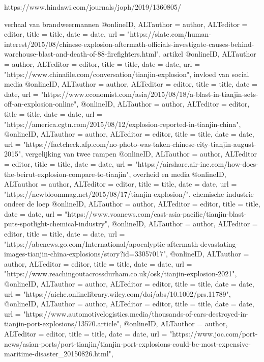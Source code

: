 {{{{{{{{{{{https://www.hindawi.com/journals/joph/2019/1360805/ 
\cite{jiang16042019TanjinExplosion}

verhaal van brandweermannen
@online{ID,	ALTauthor = {author},	ALTeditor = {editor},	title = {title},	date = {date},	url = {"https://slate.com/human-interest/2015/08/chinese-explosion-aftermath-officials-investigate-causes-behind-warehouse-blast-and-death-of-88-firefighters.html"},}
artikel
@online{ID,	ALTauthor = {author},	ALTeditor = {editor},	title = {title},	date = {date},	url = {"https://www.chinafile.com/conversation/tianjin-explosion"},}
invloed van social media
@online{ID,	ALTauthor = {author},	ALTeditor = {editor},	title = {title},	date = {date},	url = {"https://www.economist.com/asia/2015/08/18/a-blast-in-tianjin-sets-off-an-explosion-online"},}
@online{ID,	ALTauthor = {author},	ALTeditor = {editor},	title = {title},	date = {date},	url = {"https://america.cgtn.com/2015/08/12/explosion-reported-in-tianjin-china"},}
@online{ID,	ALTauthor = {author},	ALTeditor = {editor},	title = {title},	date = {date},	url = {"https://factcheck.afp.com/no-photo-was-taken-chinese-city-tianjin-august-2015"},}
vergelijking van twee rampen
@online{ID,	ALTauthor = {author},	ALTeditor = {editor},	title = {title},	date = {date},	url = {"https://airshare.air-inc.com/how-does-the-beirut-explosion-compare-to-tianjin"},}
overheid en media
@online{ID,	ALTauthor = {author},	ALTeditor = {editor},	title = {title},	date = {date},	url = {"https://newbloommag.net/2015/08/17/tianjin-explosion/"},}
chemische industrie ondeer de loep
@online{ID,	ALTauthor = {author},	ALTeditor = {editor},	title = {title},	date = {date},	url = {"https://www.voanews.com/east-asia-pacific/tianjin-blast-puts-spotlight-chemical-industry"},}
@online{ID,	ALTauthor = {author},	ALTeditor = {editor},	title = {title},	date = {date},	url = {"https://abcnews.go.com/International/apocalyptic-aftermath-devastating-images-tianjin-china-explosions/story?id=33057017"},}
@online{ID,	ALTauthor = {author},	ALTeditor = {editor},	title = {title},	date = {date},	url = {"https://www.reachingoutacrossdurham.co.uk/osk/tianjin-explosion-2021"},}
@online{ID,	ALTauthor = {author},	ALTeditor = {editor},	title = {title},	date = {date},	url = {"https://aiche.onlinelibrary.wiley.com/doi/abs/10.1002/prs.11789"},}
@online{ID,	ALTauthor = {author},	ALTeditor = {editor},	title = {title},	date = {date},	url = {"https://www.automotivelogistics.media/thousands-of-cars-destroyed-in-tianjin-port-explosions/13570.article"},}
@online{ID,	ALTauthor = {author},	ALTeditor = {editor},	title = {title},	date = {date},	url = {"https://www.joc.com/port-news/asian-ports/port-tianjin/tianjin-port-explosions-could-be-most-expensive-maritime-disaster_20150826.html"},}
}}}}}}}}}}}
